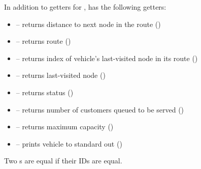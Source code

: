  In addition to getters for ,  has the
following getters:
\begin{itemize}
    \item[]  -- returns distance to next node in the route ()
    \item[]  -- returns route ()
    \item[]  -- returns index of vehicle's last-visited node in its route ()
    \item[]  -- returns last-visited node ()
    \item[]  -- returns status ()
    \item[]  -- returns number of customers queued to be served ()
    \item[]  -- returns maximum capacity ()
    \item[]  -- prints vehicle to standard out ()
\end{itemize}


Two s are equal if their IDs are equal.

